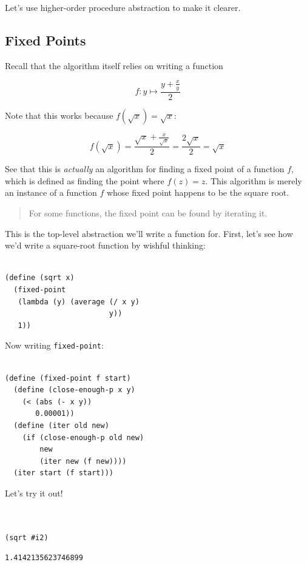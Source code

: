 \documentclass[9pt]{report}
\begin{document}
Let's use higher-order procedure abstraction to make it clearer.

\subsection{Fixed Points}
\label{sec:org7dc6a2d}

Recall that the algorithm itself relies on writing a function

$$f\colon y\mapsto \frac{y+\frac{x}{y}}{2}$$

Note that this works because \(f(\sqrt{x}) = \sqrt{x}\):

$$f(\sqrt{x})=\frac{\sqrt{x}+\frac{x}{\sqrt{x}}}{2} = \frac{2\sqrt{x}}{2} = \sqrt{x}$$

See that this is \emph{actually} an algorithm for finding a fixed point
of a function \(f\), which is defined as finding the point where
\(f(z)=z\). This algorithm is merely an instance of a function \(f\)
whose fixed point happens to be the square root.

\begin{quote}
For some functions, the fixed point can be found by iterating it.
\end{quote}

This is the top-level abstraction we'll write a function for.
First, let's see how we'd write a square-root function by wishful
thinking:

\begin{verbatim}

(define (sqrt x)
  (fixed-point
   (lambda (y) (average (/ x y)
                        y))
   1))
\end{verbatim}

Now writing \texttt{fixed-point}:

\begin{verbatim}

(define (fixed-point f start)
  (define (close-enough-p x y)
    (< (abs (- x y))
       0.00001))
  (define (iter old new)
    (if (close-enough-p old new)
        new
        (iter new (f new))))
  (iter start (f start)))
\end{verbatim}

Let's try it out!

\begin{verbatim}


(sqrt #i2)
\end{verbatim}

\begin{verbatim}
1.4142135623746899
\end{verbatim}
\end{document}
